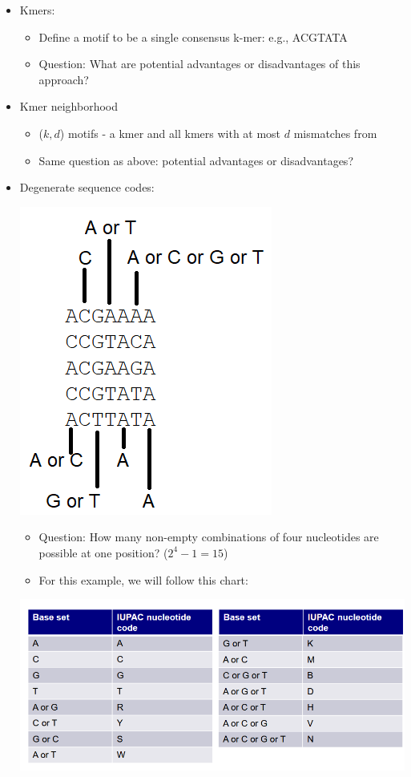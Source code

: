 \documentclass[10pt]{article}
\begin{document}
\begin{itemize}
	\item Kmers:
	\begin{itemize}
        \item Define a motif to be a single consensus k-mer: e.g., ACGTATA
        \item Question: What are potential advantages or disadvantages of this approach?
    \end{itemize}
    \item Kmer neighborhood
    \begin{itemize}
        \item ($k, d$) motifs - a kmer and all kmers with at most $d$ mismatches from 
        \item Same question as above: potential advantages or disadvantages?
    \end{itemize}
    \item Degenerate sequence codes:
    \begin{center} 
        \includegraphics*[scale=0.8]{W7_5.png} 
    \end{center}
    \begin{itemize}
        \item Question: How many non-empty combinations of four nucleotides are possible at one position?  ($2^4 - 1 = 15$)
        \item For this example, we will follow this chart:
    \end{itemize}
    \begin{center} 
        \includegraphics*[width=\textwidth]{W7_6.png} 

\end{center}
\end{itemize}
\end{document}
